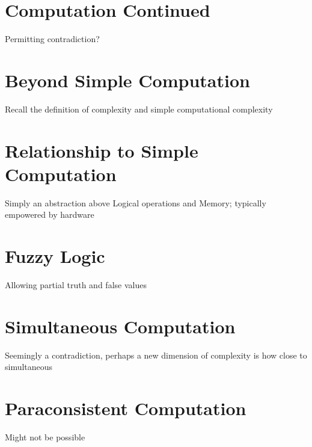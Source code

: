 \documentclass[11pt]{article}
\begin{document}
\section*{Computation Continued}
Permitting contradiction?

\section{Beyond Simple Computation}
Recall the definition of complexity and simple computational complexity

\section{Relationship to Simple Computation}
Simply an abstraction above Logical operations and Memory; typically empowered by hardware

\section{Fuzzy Logic}
Allowing partial truth and false values

\section{Simultaneous Computation}
Seemingly a contradiction, perhaps a new dimension of complexity is how close to simultaneous

\section{Paraconsistent Computation}
Might not be possible
\end{document}

